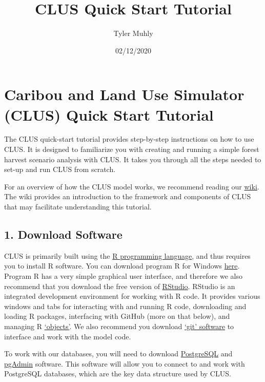 \documentclass[
]{article}
\title{CLUS Quick Start Tutorial}
\author{Tyler Muhly}
\date{02/12/2020}
\begin{document}
\maketitle

\hypertarget{caribou-and-land-use-simulator-clus-quick-start-tutorial}{%
\section{Caribou and Land Use Simulator (CLUS) Quick Start
Tutorial}\label{caribou-and-land-use-simulator-clus-quick-start-tutorial}}

The CLUS quick-start tutorial provides step-by-step instructions on how
to use CLUS. It is designed to familiarize you with creating and running
a simple forest harvest scenario analysis with CLUS. It takes you
through all the steps needed to set-up and run CLUS from scratch.

For an overview of how the CLUS model works, we recommend reading our
\href{https://github.com/bcgov/clus/wiki}{wiki}. The wiki provides an
introduction to the framework and components of CLUS that may facilitate
understanding this tutorial.

\hypertarget{download-software}{%
\subsection{1. Download Software}\label{download-software}}

CLUS is primarily built using the \href{https://www.r-project.org/}{R
programming language}, and thus requires you to install R software. You
can download program R for Windows
\href{https://cran.r-project.org/bin/windows/base/}{here}. Program R has
a very simple graphical user interface, and therefore we also recommend
that you download the free version of
\href{https://rstudio.com/products/rstudio/download/}{RStudio}. RStudio
is an integrated development environment for working with R code. It
provides various windows and tabs for interacting with and running R
code, downloading and loading R packages, interfacing with GitHub (more
on that below), and managing R
\href{https://www.datacamp.com/community/tutorials/data-types-in-r}{`objects'}.
We also recommend you download \href{https://gitforwindows.org/}{`git'
software} to interface and work with the model code.

To work with our databases, you will need to download
\href{https://www.postgresql.org/download/}{PostgreSQL} and
\href{https://www.pgadmin.org/}{pgAdmin} software. This software will
allow you to connect to and work with PostgreSQL databases, which are
the key data structure used by CLUS.
\end{document}
